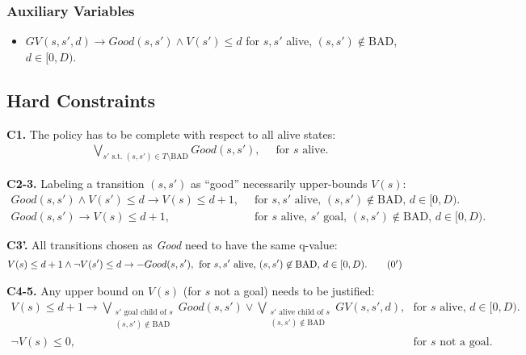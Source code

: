 \documentclass[a4paper]{article}
\newcommand{\smallpar}[1]{{\vspace{10pt}\noindent \bf #1.}}
\newcommand{\badtx}{\ensuremath{\mathrm{BAD}}}
\begin{document}
\subsubsection{Auxiliary Variables}
\begin{itemize}
 \item $GV(s, s', d) \rightarrow Good(s, s') \land V(s') \leq d$ for $s, s'$ alive, $(s, s') \not\in \badtx$, $d \in [0, D)$.
\end{itemize}

\newpage

\subsection{Hard Constraints}

\smallpar{C1}
The policy has to be complete with respect to all alive states:
\begin{align}
\bigvee_{s' \text{ s.t. } (s, s') \in T \setminus \badtx} Good(s, s'),&\;\; \text{for $s$ alive.}
\end{align}


\smallpar{C2-3} Labeling a transition $(s, s')$ as ``good'' necessarily upper-bounds $V(s)$:
\begin{align}
 Good(s, s') \land V(s') \leq d \rightarrow V(s) \leq d+1,&\;\; \text{for $s, s'$ alive, $(s, s') \not\in \badtx$, $d \in [0, D)$.} \\
 Good(s, s') \rightarrow V(s) \leq d+1,&\;\; \text{for $s$ alive, $s'$ goal, $(s, s') \not\in \badtx$, $d \in [0, D)$.}
\end{align}

\smallpar{C3'} All transitions chosen as \emph{Good} need to have the same q-value:
\begin{align}
 V(s) \leq d+1 \land \neg V(s') \leq d \rightarrow -Good(s, s'),&\;\; \text{for $s, s'$ alive, $(s, s') \not\in \badtx$, $d \in [0, D)$.} \tag{\theequation${}^\prime$}
\end{align}


\smallpar{C4-5} Any upper bound on $V(s)$ (for $s$ not a goal) needs to be justified:
\begin{align}
 V(s) \leq d+1 \rightarrow \bigvee_{\substack{
 s' \text{ goal child of } s\\
 (s, s') \not\in \badtx}} Good(s, s') \lor
 \bigvee_{\substack{
 s' \text{ alive child of } s\\
 (s, s') \not\in \badtx}} GV(s, s', d),&
 \;\; \text{for $s$ alive, $d \in [0, D)$.} \\
 \neg V(s) \leq 0,&\;\; \text{for $s$ not a goal.}
\end{align}
\end{document}
